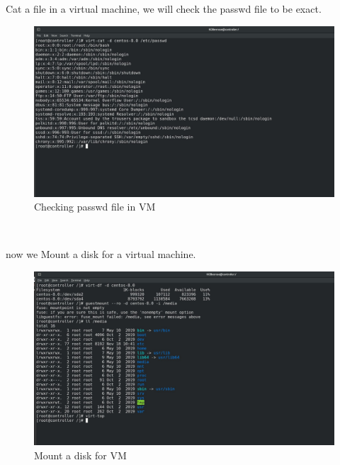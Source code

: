 \begin{spacing}{1.2}
\par 
Cat a file in a virtual machine, we will check the passwd file to be exact.
\\
\begin{figure}[!htb] 
\begin{center} 
\includegraphics[width=1\linewidth]{Cloud/Add Virtual Machine Images/KVM Install VM Management Tools/Checking passwd file in VM} 
\end{center} 
\caption{Checking passwd file in VM} 
\end{figure}  \FloatBarrier
\\

\par 
now we Mount a disk for a virtual machine.
\\
\begin{figure}[!htb] 
\begin{center} 
\includegraphics[width=1\linewidth]{Cloud/Add Virtual Machine Images/KVM Install VM Management Tools/Mount a disk for VM} 
\end{center} 
\caption{Mount a disk for VM} 
\end{figure}  \FloatBarrier
\\


\end{spacing}
